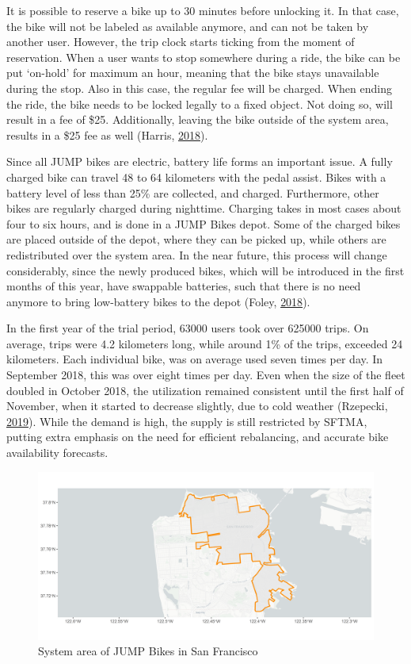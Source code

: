 \documentclass[12pt,oneside]{reedthesis}
\begin{document}
It is possible to reserve a bike up to 30 minutes before unlocking it.
In that case, the bike will not be labeled as available anymore, and can
not be taken by another user. However, the trip clock starts ticking
from the moment of reservation. When a user wants to stop somewhere
during a ride, the bike can be put `on-hold' for maximum an hour,
meaning that the bike stays unavailable during the stop. Also in this
case, the regular fee will be charged. When ending the ride, the bike
needs to be locked legally to a fixed object. Not doing so, will result
in a fee of \$25. Additionally, leaving the bike outside of the system
area, results in a \$25 fee as well (Harris,
\protect\hyperlink{ref-harris2018}{2018}).

Since all JUMP bikes are electric, battery life forms an important
issue. A fully charged bike can travel 48 to 64 kilometers with the
pedal assist. Bikes with a battery level of less than 25\% are
collected, and charged. Furthermore, other bikes are regularly charged
during nighttime. Charging takes in most cases about four to six hours,
and is done in a JUMP Bikes depot. Some of the charged bikes are placed
outside of the depot, where they can be picked up, while others are
redistributed over the system area. In the near future, this process
will change considerably, since the newly produced bikes, which will be
introduced in the first months of this year, have swappable batteries,
such that there is no need anymore to bring low-battery bikes to the
depot (Foley, \protect\hyperlink{ref-foley2018}{2018}).

In the first year of the trial period, 63000 users took over 625000
trips. On average, trips were 4.2 kilometers long, while around 1\% of
the trips, exceeded 24 kilometers. Each individual bike, was on average
used seven times per day. In September 2018, this was over eight times
per day. Even when the size of the fleet doubled in October 2018, the
utilization remained consistent until the first half of November, when
it started to decrease slightly, due to cold weather (Rzepecki,
\protect\hyperlink{ref-jump2019}{2019}). While the demand is high, the
supply is still restricted by SFTMA, putting extra emphasis on the need
for efficient rebalancing, and accurate bike availability forecasts.
\begin{figure}[h]
\includegraphics[width=\textwidth]{Figures/systemarea} \caption{System area of JUMP Bikes in San Francisco}\label{fig:systemarea}
\end{figure}
\end{document}
